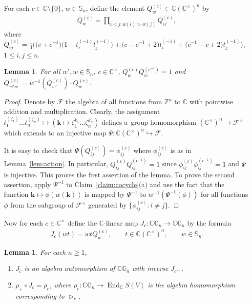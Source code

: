 \documentclass[pdftex]{sigma}
\DeclareMathOperator{\End}{End}
\newcommand{\g}[1]{t_{#1}^{(-1)}}
\newtheorem{Lemma}[Theorem]{Lemma}
\begin{document}
For each $c\in \mathbb C\setminus\{0\}$, $w\in \mathbb S_n$, def\/ine the element $Q_w^{(c)}\in \mathbb C (\mathbb C^\times)^n$ by
\begin{gather*}
Q_w^{(c)} = \prod\limits_{i<j:w(i)>w(j)} Q_{ij}^{(c)},
\end{gather*}
where $ Q_{ij}^{(c)} = \frac14 \big(\big(c+c^{-1}\big)\big(1-\g i\g j\big)+ \big(c-c^{-1}+2\big)\g i+\big(c^{-1}-c+2\big)\g j\big)$, $1\le i,j\le n$.
\begin{Lemma}\label{lem:Q}
For all $w',w\in \mathbb S_n$, $c\in\mathbb C^\times$, $Q_w^{(c)}Q_w^{(c^{-1})}=1$ and
$Q_{w'w}^{(c)}=w^{-1}(Q_{w'}^{(c)})\cdot Q_w^{(c)}$.
\end{Lemma}
\begin{proof}
Denote by $\mathcal F$ the algebra of all functions from $\mathbb Z^n$ to $\mathbb C$ with pointwise addition and
multiplication.
Clearly, the assignment $t_1^{(\zeta_1)}\ldots t_n^{(\zeta_n)} \mapsto (\mathbf k\mapsto \zeta_1^{k_1}\ldots
\zeta_n^{k_n})$ def\/ines a~group homomorphism $(\mathbb C^\times)^n\to \mathcal F^\times $ which extends to an injective
map $\Psi\colon \mathbb C(\mathbb C^\times)^n\hookrightarrow \mathcal F$.

It is easy to check that $\Psi(Q_{ij}^{(c)})=\phi_{ij}^{(c)}$ where $\phi_{ij}^{(c)}$ is as in Lemma~\ref{lem:action}.
In particular, $Q_{ij}^{(c)}Q_{ij}^{(c^{-1})}=1$ since $\phi_{ij}^{(c)}\phi_{ij}^{(c^{-1})}=1$ and $\Psi$ is injective.
This proves the f\/irst assertion of the lemma.
To prove the second assertion, apply $\Psi^{-1}$ to Claim~\ref{claim:cocycle}(a) and use the fact that the function
$\mathbf k\mapsto \phi(w(\mathbf k))$ is mapped by $\Psi^{-1}$ to $w^{-1}(\Psi^{-1}(\phi))$ for all functions $\phi$
from the subgroup of $\mathcal F^\times$ generated by $\{\phi_{ij}^{(c)}:i\ne j\}$.
\end{proof}

Now for each $c\in\mathbb C^\times$ def\/ine the $\mathbb C$-linear map $J_c\colon \mathbb C\mathbb G_n\to \mathbb
C\mathbb G_n$ by the formula
\begin{gather*}
J_c(wt)=wtQ^{(c)}_w,
\qquad
t\in \mathbb C(\mathbb C^\times)^n,
\qquad
w\in \mathbb S_n.
\end{gather*}
\begin{Lemma}\label{lem:J_c}
For each $n\ge 1$,
\begin{enumerate}\itemsep=0pt
\item[$(a)$] $J_c$ is an algebra automorphism of $\mathbb C \mathbb G_n$ with inverse $J_{c^{-1}}$.

\item[$(b)$] $\rho_+\circ J_c=\rho_c$, where $\rho_c:\mathbb C \mathbb G_n\to \End_\mathbb C S(V)$ is the algebra homomorphism
corresponding to $\mathop{\triangleright}\nolimits_c$.
\end{enumerate}
\end{Lemma}
\end{document}
